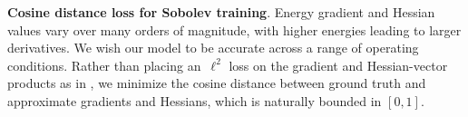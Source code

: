 \textbf{Cosine distance loss for Sobolev training}.
Energy gradient and Hessian values vary over many orders of magnitude, with
higher energies leading to larger derivatives.
We wish our model to be accurate across a range of operating conditions.
Rather than placing an~$\ell^2$ loss on the gradient and Hessian-vector products as in \citet{czarnecki2017sobolev}, we minimize the cosine distance between ground truth and approximate gradients and Hessians, which is naturally bounded in $[0, 1]$.
